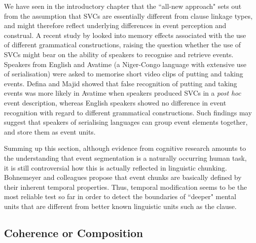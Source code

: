 We have seen in the introductory chapter that the ``all-new approach" sets out from the assumption that SVCs are essentially different from clause linkage types, and might therefore reflect underlying differences in event perception and construal. A recent study by \citet{defina2012conceptual} looked into memory effects associated with the use of different grammatical constructions, raising the question whether the use of SVCs might bear on the ability of speakers to recognise and retrieve events. Speakers from English and Avatime (a Niger-Congo language with extensive use of serialisation) were asked to memorise short video clips of putting and taking events. Defina and Majid showed that false recognition of putting and taking events was more likely in Avatime when speakers produced SVCs in a \textit{post hoc} event description, whereas English speakers showed no difference in event recognition with regard to different grammatical constructions. Such findings may suggest that speakers of serialising languages can group event elements together, and store them as event units.

Summing up this section, although evidence from cognitive research amounts to the understanding that event segmentation is a naturally occurring human task, it is still controversial how this is actually reflected in linguistic chunking. Bohnemeyer and colleagues propose that event chunks are basically defined by their inherent temporal properties. Thus, temporal modification seems to be the most reliable test so far in order to detect the boundaries of ``deeper" mental units that are different from better known linguistic units such as the clause.

\subsection{Coherence or Composition} \label{sec:coherence}

